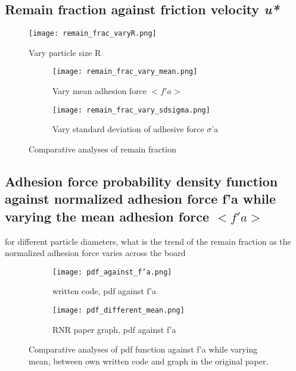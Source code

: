 \documentclass{article}
\begin{document}
\subsection{Remain fraction against friction velocity \textit{u*}}
\begin{figure}[htbp]
    \centering
    \texttt{[image: remain\_frac\_varyR.png]}
    \caption{Vary particle size R}
    \label{fig:enter-label}
\end{figure}

\begin{figure}[H]
    \centering
    \begin{subfigure}{0.48\linewidth}
        \texttt{[image: remain\_frac\_vary\_mean.png]}
        \caption{Vary mean adhesion force $<f'a>$}
    \end{subfigure}
    \hfill
    \begin{subfigure}{0.48\linewidth}
        \texttt{[image: remain\_frac\_vary\_sdsigma.png]}
        \caption{Vary standard deviation of adhesive force $\sigma$'a}
    \end{subfigure}
    \caption{Comparative analyses of remain fraction}
\end{figure}

\newpage
\subsection{Adhesion force probability density function against normalized adhesion force f'a while varying the mean adhesion force $<f'a>$}
for different particle diameters, what is the trend of the remain fraction as the normalized adhesion force varies across the board
\begin{figure}[H]
    \centering
    \begin{subfigure}{0.48\linewidth}
        \texttt{[image: pdf\_against\_f'a.png]}
        \caption{written code, pdf against f'a}
    \end{subfigure}
    \hfill
    \begin{subfigure}{0.48\linewidth}
        \texttt{[image: pdf\_different\_mean.png]}
        \caption{RNR paper graph, pdf against f'a}
    \end{subfigure}
    \caption{Comparative analyses of pdf function against f'a while varying mean, between own written code and graph in the original paper.}
    \vspace{-10pt}
\end{figure}
\end{document}
